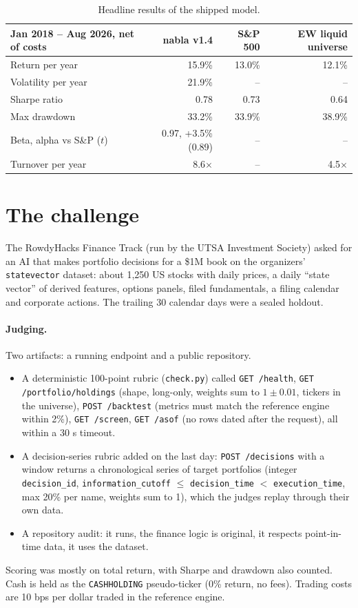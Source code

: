 \documentclass[11pt]{article}
\newcommand{\code}[1]{\texttt{#1}}
\begin{document}
\begin{table}[H]\centering\small
\begin{tabular}{lrrr}
\toprule
Jan 2018 -- Aug 2026, net of costs & nabla v1.4 & S\&P 500 & EW liquid universe \\
\midrule
Return per year & 15.9\% & 13.0\% & 12.1\% \\
Volatility per year & 21.9\% & -- & -- \\
Sharpe ratio & 0.78 & 0.73 & 0.64 \\
Max drawdown & 33.2\% & 33.9\% & 38.9\% \\
Beta, alpha vs S\&P ($t$) & 0.97, +3.5\% (0.89) & -- & -- \\
Turnover per year & 8.6$\times$ & -- & 4.5$\times$ \\
\bottomrule
\end{tabular}
\caption{Headline results of the shipped model.}
\end{table}

\section{The challenge}

The RowdyHacks Finance Track (run by the UTSA Investment Society) asked for an AI that makes portfolio decisions for
a \$1M book on the organizers' \code{statevector} dataset: about 1,250 US stocks with daily prices, a daily ``state
vector'' of derived features, options panels, filed fundamentals, a filing calendar and corporate actions. The trailing
30 calendar days were a sealed holdout.

\paragraph{Judging.} Two artifacts: a running endpoint and a public repository.
\begin{itemize}
\item A deterministic 100-point rubric (\code{check.py}) called \code{GET /health}, \code{GET /portfolio/holdings}
(shape, long-only, weights sum to $1\pm0.01$, tickers in the universe), \code{POST /backtest} (metrics must match the
reference engine within 2\%), \code{GET /screen}, \code{GET /asof} (no rows dated after the request), all within a 30 s
timeout.
\item A decision-series rubric added on the last day: \code{POST /decisions} with a window returns a chronological series
of target portfolios (integer \code{decision\_id}, \code{information\_cutoff} $\le$ \code{decision\_time} $<$
\code{execution\_time}, max 20\% per name, weights sum to 1), which the judges replay through their own data.
\item A repository audit: it runs, the finance logic is original, it respects point-in-time data, it uses the dataset.
\end{itemize}
Scoring was mostly on total return, with Sharpe and drawdown also counted. Cash is held as the \code{CASHHOLDING}
pseudo-ticker (0\% return, no fees). Trading costs are 10 bps per dollar traded in the reference engine.
\end{document}
